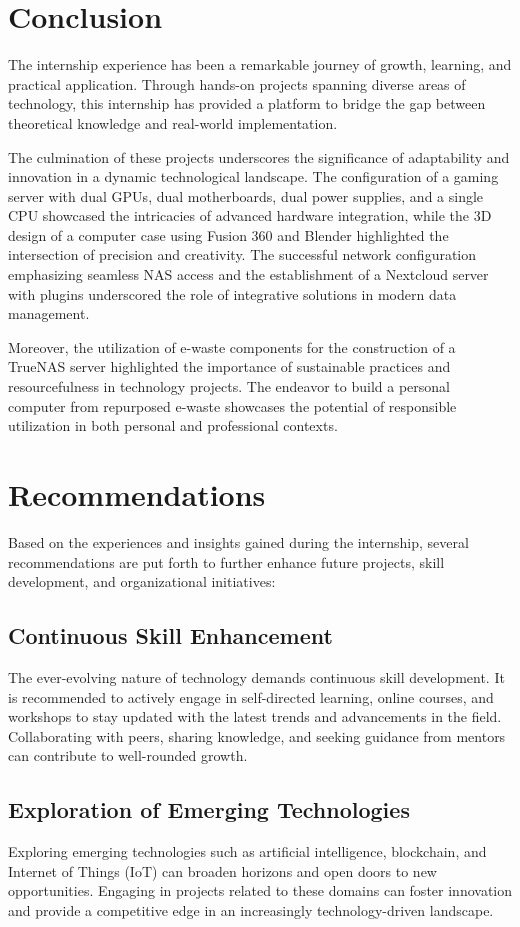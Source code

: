 \section{Conclusion}
The internship experience has been a remarkable journey of growth, learning, and practical application. Through hands-on projects spanning diverse areas of technology, this internship has provided a platform to bridge the gap between theoretical knowledge and real-world implementation.

The culmination of these projects underscores the significance of adaptability and innovation in a dynamic technological landscape. The configuration of a gaming server with dual GPUs, dual motherboards, dual power supplies, and a single CPU showcased the intricacies of advanced hardware integration, while the 3D design of a computer case using Fusion 360 and Blender highlighted the intersection of precision and creativity. The successful network configuration emphasizing seamless NAS access and the establishment of a Nextcloud server with plugins underscored the role of integrative solutions in modern data management.

Moreover, the utilization of e-waste components for the construction of a TrueNAS server highlighted the importance of sustainable practices and resourcefulness in technology projects. The endeavor to build a personal computer from repurposed e-waste showcases the potential of responsible utilization in both personal and professional contexts.


\section{Recommendations}
Based on the experiences and insights gained during the internship, several recommendations are put forth to further enhance future projects, skill development, and organizational initiatives:

\subsection{Continuous Skill Enhancement}
The ever-evolving nature of technology demands continuous skill development. It is recommended to actively engage in self-directed learning, online courses, and workshops to stay updated with the latest trends and advancements in the field. Collaborating with peers, sharing knowledge, and seeking guidance from mentors can contribute to well-rounded growth.

\subsection{Exploration of Emerging Technologies}
Exploring emerging technologies such as artificial intelligence, blockchain, and Internet of Things (IoT) can broaden horizons and open doors to new opportunities. Engaging in projects related to these domains can foster innovation and provide a competitive edge in an increasingly technology-driven landscape.

